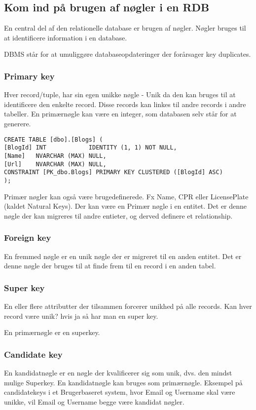 \subsection{Kom ind på brugen af nøgler i en RDB}\label{sec:keys}
En central del af den relationelle database er brugen af nøgler. Nøgler bruges til at identificere information i en database.

DBMS står for at umuliggøre databaseopdateringer der forårsager key duplicates.

\subsubsection{Primary key}
Hver record/tuple, har sin egen unikke nøgle - Unik da den kan bruges til at identificere den enkelte record. Disse records kan linkes til andre records i andre tabeller. En primærnøgle kan være en integer, som databasen selv står for at generere.

\begin{lstlisting}
CREATE TABLE [dbo].[Blogs] (
[BlogId] INT            IDENTITY (1, 1) NOT NULL,
[Name]   NVARCHAR (MAX) NULL,
[Url]    NVARCHAR (MAX) NULL,
CONSTRAINT [PK_dbo.Blogs] PRIMARY KEY CLUSTERED ([BlogId] ASC)
);
\end{lstlisting}

Primær nøgler kan også være brugedefinerede. Fx Name, CPR eller  LicensePlate (kaldet Natural Keys). Der kan være en Primær nøgle i en entitet. Det er denne nøgle der kan migreres til andre entieter, og derved definere et relationship.
\subsubsection{Foreign key}
En fremmed nøgle er en unik nøgle der er migreret til en anden entitet.
Det er denne nøgle der bruges til at finde frem til en record i en anden tabel.

\subsubsection{Super key}
En eller flere attributter der tilsammen forcerer unikhed på alle records.
Kan hver record være unik? hvis ja så har man en super key.

En primærnøgle er en superkey.

\subsubsection{Candidate key}
En kandidatnøgle er en nøgle der kvalificerer sig som unik, dvs. den mindst mulige Superkey. En kandidatnøgle kan bruges som primærnøgle. Eksempel på candidatekeys i et Brugerbaseret system, hvor Email og Username skal være unikke, vil Email og Username begge være kandidat nøgler.


